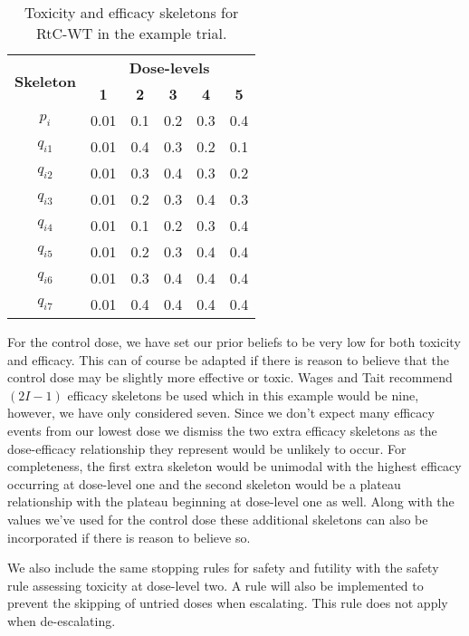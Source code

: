  \begin{table}[!h]
 	\centering
 	\caption{Toxicity and efficacy skeletons for RtC-WT in the example trial.}
 	\label{tab_wt:tox-eff-skeleton}
 	\begin{tabular}{c|ccccc}
 		\hline
 		\multicolumn{1}{c|}{\multirow{2}{*}{\textbf{Skeleton}}} & \multicolumn{5}{c}{\textbf{Dose-levels}}                       \\
 		\multicolumn{1}{c|}{}                                   & \textbf{1} & \textbf{2} & \textbf{3} & \textbf{4} & \textbf{5} \\ \hline
 		$p_i$    & 0.01 & 0.1 & 0.2 & 0.3 & 0.4 \\
 		$q_{i1}$ & 0.01 & 0.4 & 0.3 & 0.2 & 0.1 \\
 		$q_{i2}$ & 0.01 & 0.3 & 0.4 & 0.3 & 0.2 \\
 		$q_{i3}$ & 0.01 & 0.2 & 0.3 & 0.4 & 0.3 \\
 		$q_{i4}$ & 0.01 & 0.1 & 0.2 & 0.3 & 0.4 \\
 		$q_{i5}$ & 0.01 & 0.2 & 0.3 & 0.4 & 0.4 \\
 		$q_{i6}$ & 0.01 & 0.3 & 0.4 & 0.4 & 0.4 \\
 		$q_{i7}$ & 0.01 & 0.4 & 0.4 & 0.4 & 0.4 \\ \hline
 	\end{tabular}
 \end{table}
 
 For the control dose, we have set our prior beliefs to be very low for both toxicity and efficacy. This can of course be adapted if there is reason to believe that the control dose may be slightly more effective or toxic. Wages and Tait recommend $(2I-1)$ efficacy skeletons be used which in this example would be nine, however, we have only considered seven. Since we don't expect many efficacy events from our lowest dose we dismiss the two extra efficacy skeletons as the dose-efficacy relationship they represent would be unlikely to occur. For completeness, the first extra skeleton would be unimodal with the highest efficacy occurring at dose-level one and the second skeleton would be a plateau relationship with the plateau beginning at dose-level one as well. Along with the values we've used for the control dose these additional skeletons can also be incorporated if there is reason to believe so. 
 
 We also include the same stopping rules for safety and futility with the safety rule assessing toxicity at dose-level two. A rule will also be implemented to prevent the skipping of untried doses when escalating. This rule does not apply when de-escalating. 
 
